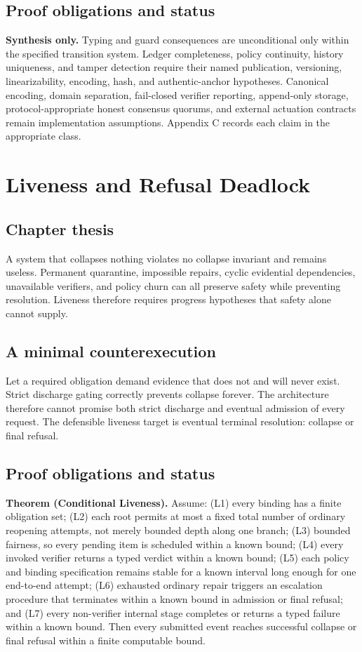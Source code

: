 \documentclass[11pt,openany]{book}
\begin{document}
\section{Proof obligations and status}
\textbf{Synthesis only.} Typing and guard consequences are unconditional only
within the specified transition system. Ledger completeness, policy continuity,
history uniqueness, and tamper detection require their named publication,
versioning, linearizability, encoding, hash, and authentic-anchor hypotheses.
Canonical encoding, domain separation, fail-closed verifier reporting,
append-only storage, protocol-appropriate honest consensus quorums, and
external actuation contracts remain implementation assumptions. Appendix C
records each claim in the appropriate class.

\chapter{Liveness and Refusal Deadlock}
\section{Chapter thesis}
A system that collapses nothing violates no collapse invariant and remains
useless. Permanent quarantine, impossible repairs, cyclic evidential
dependencies, unavailable verifiers, and policy churn can all preserve safety
while preventing resolution. Liveness therefore requires progress hypotheses
that safety alone cannot supply.

\section{A minimal counterexecution}
Let a required obligation demand evidence that does not and will never exist.
Strict discharge gating correctly prevents collapse forever. The architecture
therefore cannot promise both strict discharge and eventual admission of every
request. The defensible liveness target is eventual terminal resolution:
collapse or final refusal.

\section{Proof obligations and status}
\textbf{Theorem (Conditional Liveness).} Assume: (L1) every binding has a
finite obligation set; (L2) each root permits at most a fixed total number of
ordinary reopening attempts, not merely bounded depth along one branch; (L3)
bounded fairness, so every pending item is scheduled within a known bound; (L4)
every invoked verifier returns a typed verdict within a known bound; (L5) each
policy and binding specification remains stable for a known interval long
enough for one end-to-end attempt; (L6) exhausted ordinary repair triggers an
escalation procedure that terminates within a known bound in admission or
final refusal; and (L7) every non-verifier internal stage completes or returns
a typed failure within a known bound. Then every submitted event reaches
successful collapse or final refusal within a finite computable bound.
\end{document}
